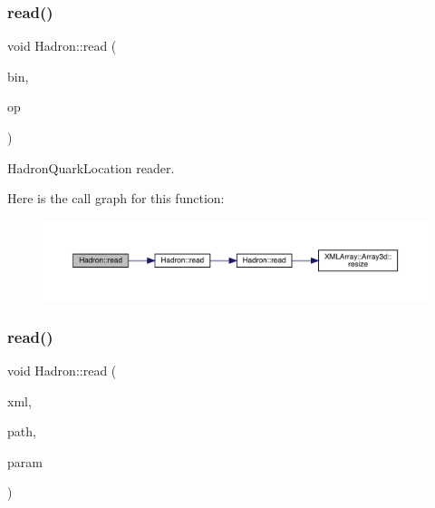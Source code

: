 \subsubsection{\texorpdfstring{read()}{read()}\hspace{0.1cm}{\footnotesize\ttfamily [66/94]}}
{\footnotesize\ttfamily void Hadron\+::read (\begin{DoxyParamCaption}\item[{\mbox{\hyperlink{classADATIO_1_1BinaryReader}{Binary\+Reader}} \&}]{bin,  }\item[{\mbox{\hyperlink{structHadron_1_1HadronQuarkLocation__t}{Hadron\+Quark\+Location\+\_\+t}} \&}]{op }\end{DoxyParamCaption})}



Hadron\+Quark\+Location reader. 

Here is the call graph for this function\+:
\nopagebreak
\begin{figure}[H]
\begin{center}
\leavevmode
\includegraphics[width=350pt]{d1/daf/namespaceHadron_a6860ee691eb6d64d0fb2d52f4977316b_cgraph}
\end{center}
\end{figure}
\mbox{\label{namespaceHadron_a6eef93fdb3fe356c6326b6e8e0757ccb}} 
\subsubsection{\texorpdfstring{read()}{read()}\hspace{0.1cm}{\footnotesize\ttfamily [67/94]}}
{\footnotesize\ttfamily void Hadron\+::read (\begin{DoxyParamCaption}\item[{\mbox{\hyperlink{classADATXML_1_1XMLReader}{X\+M\+L\+Reader}} \&}]{xml,  }\item[{const std\+::string \&}]{path,  }\item[{\mbox{\hyperlink{structHadron_1_1KeyHadronNode__t_1_1Quark__t}{Key\+Hadron\+Node\+\_\+t\+::\+Quark\+\_\+t}} \&}]{param }\end{DoxyParamCaption})}



